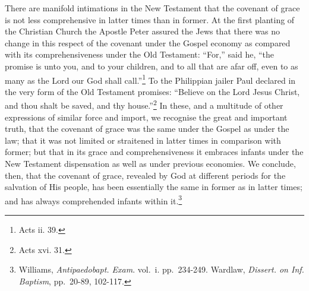 \documentclass[]{book}
\begin{document}
There are manifold intimations in the New Testament that the covenant of grace is not less comprehensive in latter times than in former. At the first planting of the Christian Church the Apostle Peter assured the Jews that there was no change in this respect of the covenant under the Gospel economy as compared with its comprehensiveness under the Old Testament: ``For,'' said he, ``the promise is unto you, and to your children, and to all that are afar off, even to as many as the Lord our God shall call.''\footnote{Acts ii. 39.} To the Philippian jailer Paul declared in the very form of the Old Testament promises: ``Believe on the Lord Jesus Christ, and thou shalt be saved, and thy house.''\footnote{Acts xvi. 31.} In these, and a multitude of other expressions of similar force and import, we recognise the great and important truth, that the covenant of grace was the same under the Gospel as under the law; that it was not limited or straitened in latter times in comparison with former; but that in its grace and comprehensiveness it embraces infants under the New Testament dispensation as well as under previous economies. We conclude, then, that the covenant of grace, revealed by God at different periods for the salvation of His people, has been essentially the same in former as in latter times; and has always comprehended infants within it.\footnote{Williams, \emph{Antipaedobapt. Exam}. vol.~i. pp.~234-249. Wardlaw, \emph{Dissert. on Inf. Baptism}, pp.~20-89, 102-117.}
\end{document}
